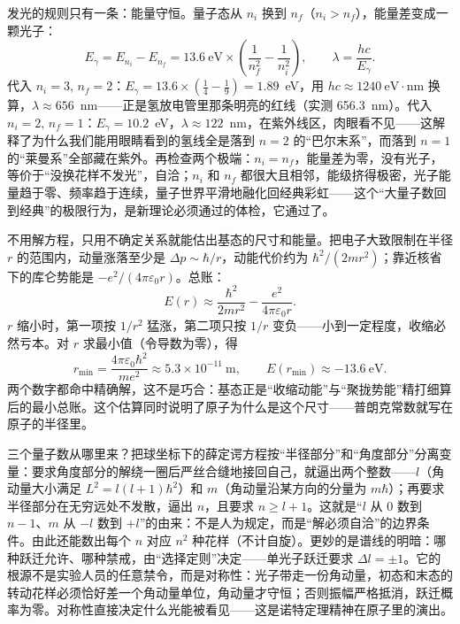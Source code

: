 发光的规则只有一条：能量守恒。量子态从 \(n_i\) 换到 \(n_f\)（\(n_i>n_f\)），能量差变成一颗光子：
\[
E_\gamma=E_{n_i}-E_{n_f}=13.6\ \mathrm{eV}\times\left(\frac{1}{n_f^2}-\frac{1}{n_i^2}\right),
\qquad \lambda=\frac{hc}{E_\gamma}.
\]
代入 \(n_i=3,\,n_f=2\)：\(E_\gamma=13.6\times(\frac14-\frac19)=1.89\)~eV，用 \(hc\approx1240\ \mathrm{eV\cdot nm}\) 换算，\(\lambda\approx656\)~nm——正是氢放电管里那条明亮的红线（实测 656.3~nm）。代入 \(n_i=2,\,n_f=1\)：\(E_\gamma=10.2\)~eV，\(\lambda\approx122\)~nm，在紫外线区，肉眼看不见——这解释了为什么我们能用眼睛看到的氢线全是落到 \(n=2\) 的“巴尔末系”，而落到 \(n=1\) 的“莱曼系”全部藏在紫外。再检查两个极端：\(n_i=n_f\)，能量差为零，没有光子，等价于“没换花样不发光”，自洽；\(n_i\) 和 \(n_f\) 都很大且相邻，能级挤得极密，光子能量趋于零、频率趋于连续，量子世界平滑地融化回经典彩虹——这个“大量子数回到经典”的极限行为，是新理论必须通过的体检，它通过了。

\begin{mathbridge}
不用解方程，只用不确定关系就能估出基态的尺寸和能量。把电子大致限制在半径 \(r\) 的范围内，动量涨落至少是 \(\Delta p\sim \hbar/r\)，动能代价约为 \(\hbar^2/(2mr^2)\)；靠近核省下的库仑势能是 \(-e^2/(4\pi\varepsilon_0 r)\)。总账：
\[
E(r)\approx\frac{\hbar^2}{2mr^2}-\frac{e^2}{4\pi\varepsilon_0 r}.
\]
\(r\) 缩小时，第一项按 \(1/r^2\) 猛涨，第二项只按 \(1/r\) 变负——小到一定程度，收缩必然亏本。对 \(r\) 求最小值（令导数为零），得
\[
r_{\min}=\frac{4\pi\varepsilon_0\hbar^2}{me^2}\approx 5.3\times10^{-11}\ \mathrm{m},
\qquad E(r_{\min})\approx-13.6\ \mathrm{eV}.
\]
两个数字都命中精确解，这不是巧合：基态正是“收缩动能”与“聚拢势能”精打细算后的最小总账。这个估算同时说明了原子为什么是这个尺寸——普朗克常数就写在原子的半径里。
\end{mathbridge}

\begin{challenge}
三个量子数从哪里来？把球坐标下的薛定谔方程按“半径部分”和“角度部分”分离变量：要求角度部分的解绕一圈后严丝合缝地接回自己，就逼出两个整数——\(l\)（角动量大小满足 \(L^2=l(l+1)\hbar^2\)）和 \(m\)（角动量沿某方向的分量为 \(m\hbar\)）；再要求半径部分在无穷远处不发散，逼出 \(n\)，且要求 \(n\ge l+1\)。这就是“\(l\) 从 0 数到 \(n-1\)、\(m\) 从 \(-l\) 数到 \(+l\)”的由来：不是人为规定，而是“解必须自洽”的边界条件。由此还能数出每个 \(n\) 对应 \(n^2\) 种花样（不计自旋）。更妙的是谱线的明暗：哪种跃迁允许、哪种禁戒，由“选择定则”决定——单光子跃迁要求 \(\Delta l=\pm1\)。它的根源不是实验人员的任意禁令，而是对称性：光子带走一份角动量，初态和末态的转动花样必须恰好差一个角动量单位，角动量才守恒；否则振幅严格抵消，跃迁概率为零。对称性直接决定什么光能被看见——这是诺特定理精神在原子里的演出。
\end{challenge}

